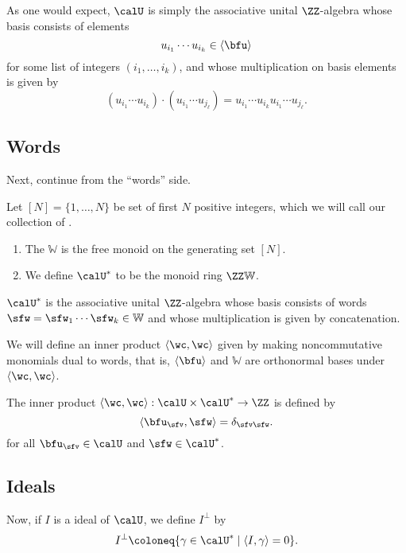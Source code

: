 \documentclass{article}
\newcommand{\ip}[1]{
    \left\langle
        {#1}
    \right\rangle
}
\newcommand*\WW{\mathbb{W}}
\begin{document}
As one would expect, $\calU$ is simply the associative unital $\ZZ$-algebra whose basis consists of elements
\[
    u_{i_1} \cdots u_{i_k} \in \langle \bfu \rangle
\]
for some list of integers $(i_1,\ldots,i_k)$, and whose multiplication on basis elements is given by
\[
    (u_{i_1} \cdots u_{i_k}) \cdot (u_{i_1} \cdots u_{j_\ell})
    =
    u_{i_1} \cdots u_{i_k} u_{i_1} \cdots u_{j_\ell}.
\]

\subsection{Words}

Next, continue from the ``words'' side.

\begin{definition}
    Let $[N] = \{1,\ldots,N\}$ be set of first $N$ positive integers, which we will call our collection of .
    \begin{enumerate}[label=(\alph*)]
        \item 
            The  $\mathbb{W}$ is the free monoid on the generating set $[N]$.
        \item 
            We define $\calU^\ast$ to be the monoid ring $\ZZ\mathbb{W}$.
    \end{enumerate}
\end{definition}

$\calU^\ast$ is the associative unital $\ZZ$-algebra whose basis consists of words $\sfw = \sfw_1\cdots\sfw_k \in \WW$ and whose multiplication is given by concatenation.

We will define an inner product $\ip{\wc,\wc}$ given by making noncommutative monomials dual to words, that is, $\langle \bfu \rangle$ and $\WW$ are orthonormal bases under $\ip{\wc,\wc}$.

\begin{definition}
    The inner product $\ip{\wc,\wc}: \calU \times \calU^\ast \to \ZZ$ is defined by
    \[
        \ip{\bfu_\sfv, \sfw} 
        = 
        \delta_{\sfv\sfw}.
    \]
    for all $\bfu_\sfv \in \calU$ and $\sfw \in \calU^\ast$.
\end{definition}

\subsection{Ideals}

Now, if $I$ is a ideal of $\calU$, we define $I^\perp$ by
\[
    I^\perp
    \coloneq
    \{
        \gamma \in \calU^\ast
        \mid
        \ip{I, \gamma} = 0
    \}.
\]
\end{document}
